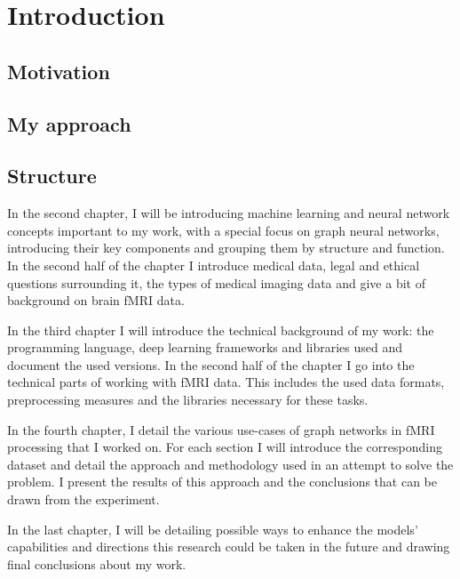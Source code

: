 \chapter{Introduction}
\section{Motivation}

\section{My approach}

\section{Structure}

In the second chapter, I will be introducing machine learning and neural network concepts important to my work, with a special focus on graph neural networks, introducing their key components and grouping them by structure and function. In the second half of the chapter I introduce medical data, legal and ethical questions surrounding it, the types of medical imaging data and give a bit of background on brain fMRI data.

In the third chapter I will introduce the technical background of my work: the programming language, deep learning frameworks and libraries used and document the used versions. In the second half of the chapter I go into the technical parts of working with fMRI data. This includes the used data formats, preprocessing measures and the libraries necessary for these tasks.

In the fourth chapter, I detail the various use-cases of graph networks in fMRI processing that I worked on. For each section I will introduce the corresponding dataset and detail the approach and methodology used in an attempt to solve the problem. I present the results of this approach and the conclusions that can be drawn from the experiment.

In the last chapter, I will be detailing possible ways to enhance the models’ capabilities
and directions this research could be taken in the future and drawing final conclusions about my work.